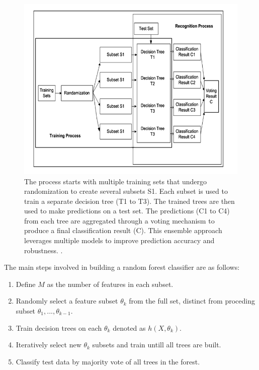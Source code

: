            \begin{figure}[H]
            \centering
            \includegraphics[width=.7\textwidth]{../src/resources/images/models/rf_image.png}
            \caption{
                The process starts with multiple training sets that undergo randomization to create several subsets S1. Each subset is used to train a separate decision tree (T1 to T3). The trained trees are then used to make predictions on a test set. The predictions (C1 to C4) from each tree are aggregated through a voting mechanism to produce a final classification result (C). This ensemble approach leverages multiple models to improve prediction accuracy and robustness. \cite{parmar_review_2019}.
            }
            \label{fig:random_forest}
            \end{figure}

            The main steps involved in building a random forest classifier are as follows:
           
            \begin{enumerate}
                \item Define $M$ as the number of features in each subset.
                \item Randomly select a feature subset $\theta_k$ from the full set, distinct from proceding subset $\theta_{1},..., \theta_{k-1}$.
                \item Train decision trees on each $\theta_k$ denoted as $h(X, \theta_k)$.
                \item Iteratively select new $\theta_k$ subsets and train untill all trees are built.
                \item Classify test data by majority vote of all trees in the forest.
            \end{enumerate}

